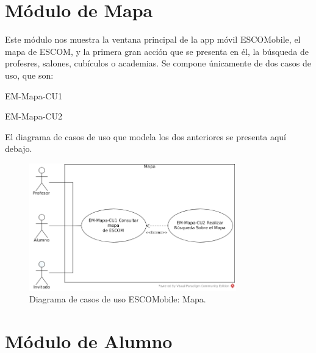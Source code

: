 \section{Módulo de Mapa}

\noindent
Este módulo nos muestra la ventana principal de la app móvil ESCOMobile, el mapa de ESCOM, y
la primera gran acción que se presenta en él, la búsqueda de profesres, salones, cubículos o academias. 
Se compone únicamente de dos casos de uso, que son:

\begin{requisitos}{EM-Mapa-CU1}
\end{requisitos}

\begin{requisitos}{EM-Mapa-CU2}
\end{requisitos}

\noindent
El diagrama de casos de uso que modela los dos anteriores se presenta aquí debajo.

\pagebreak
\begin{figure}[htbp!]
	\centering
	\includegraphics[width=0.8\textwidth]{images/casos/mapa}
	\caption{Diagrama de casos de uso ESCOMobile: Mapa.}
\end{figure}




\section{Módulo de Alumno}

